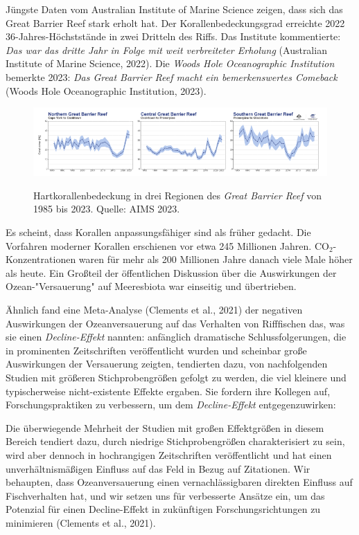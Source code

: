 \documentclass[12pt,paper=a4,DIV=12,parskip=never,chapterprefix=false,headings=standardclasses]{scrreprt}
\begin{document}
Jüngste Daten vom Australian Institute of Marine Science zeigen, dass sich das Great Barrier Reef stark erholt hat. Der Korallenbedeckungsgrad erreichte 2022 36-Jahres-Höchststände in zwei Dritteln des Riffs. Das Institute kommentierte: \emph{Das war das dritte Jahr in Folge mit weit verbreiteter Erholung} (Australian Institute of Marine Science, 2022). Die \emph{Woods Hole Oceanographic Institution} bemerkte 2023: \emph{Das Great Barrier Reef macht ein bemerkenswertes Comeback} (Woods Hole Oceanographic Institution, 2023).

\begin{figure}[H]
\begin{center}
\includegraphics[width=1.0\textwidth]{bilder/bilderKlima-0005.png}\\[1cm]
\end{center}
\caption{Hartkorallenbedeckung in drei Regionen des \emph{Great Barrier Reef} von 1985 bis 2023. Quelle: AIMS 2023.}
\end{figure}

Es scheint, dass Korallen anpassungsfähiger sind als früher gedacht. Die Vorfahren moderner Korallen erschienen vor etwa 245 Millionen Jahren. CO$_2$-Konzentrationen waren für mehr als 200 Millionen Jahre danach viele Male höher als heute. Ein Großteil der öffentlichen Diskussion über die Auswirkungen der Ozean-"Versauerung" auf Meeresbiota war einseitig und übertrieben.

Ähnlich fand eine Meta-Analyse (Clements et al., 2021) der negativen Auswirkungen der Ozeanversauerung auf das Verhalten von Rifffischen das, was sie einen \emph{Decline-Effekt} nannten: anfänglich dramatische Schlussfolgerungen, die in prominenten Zeitschriften veröffentlicht wurden und scheinbar große Auswirkungen der Versauerung zeigten, tendierten dazu, von nachfolgenden Studien mit größeren Stichprobengrößen gefolgt zu werden, die viel kleinere und typischerweise nicht-existente Effekte ergaben. Sie fordern ihre Kollegen auf, Forschungspraktiken zu verbessern, um dem \emph{Decline-Effekt} entgegenzuwirken:

Die überwiegende Mehrheit der Studien mit großen Effektgrößen in diesem Bereich tendiert dazu, durch niedrige Stichprobengrößen charakterisiert zu sein, wird aber dennoch in hochrangigen Zeitschriften veröffentlicht und hat einen unverhältnismäßigen Einfluss auf das Feld in Bezug auf Zitationen. Wir behaupten, dass Ozeanversauerung einen vernachlässigbaren direkten Einfluss auf Fischverhalten hat, und wir setzen uns für verbesserte Ansätze ein, um das Potenzial für einen Decline-Effekt in zukünftigen Forschungsrichtungen zu minimieren (Clements et al., 2021).
\end{document}
